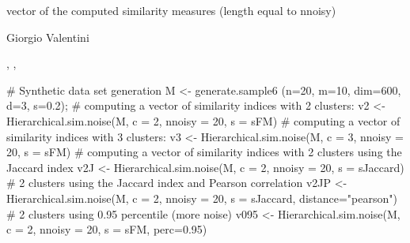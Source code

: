 \documentclass{article}
\begin{document}
\begin{Value}
vector of the computed similarity measures (length equal to nnoisy)
\end{Value}
\begin{Author}\relax
Giorgio Valentini 
\end{Author}
\begin{SeeAlso}\relax
{}, , 
\end{SeeAlso}
\begin{Examples}
\begin{ExampleCode}
# Synthetic data set generation
M <- generate.sample6 (n=20, m=10, dim=600, d=3, s=0.2);
# computing a vector of similarity indices with 2 clusters:
v2 <- Hierarchical.sim.noise(M, c = 2, nnoisy = 20,  s = sFM)
# computing a vector of similarity indices with 3 clusters:
v3 <- Hierarchical.sim.noise(M, c = 3, nnoisy = 20,  s = sFM)
# computing a vector of similarity indices with 2 clusters using the Jaccard index
v2J <- Hierarchical.sim.noise(M, c = 2, nnoisy = 20,  s = sJaccard)
#  2 clusters using the Jaccard index and Pearson correlation
v2JP <- Hierarchical.sim.noise(M, c = 2, nnoisy = 20, s = sJaccard, distance="pearson")
# 2 clusters using 0.95 percentile (more noise)
v095 <- Hierarchical.sim.noise(M, c = 2, nnoisy = 20,  s = sFM, perc=0.95)
\end{ExampleCode}
\end{Examples}
\end{document}
